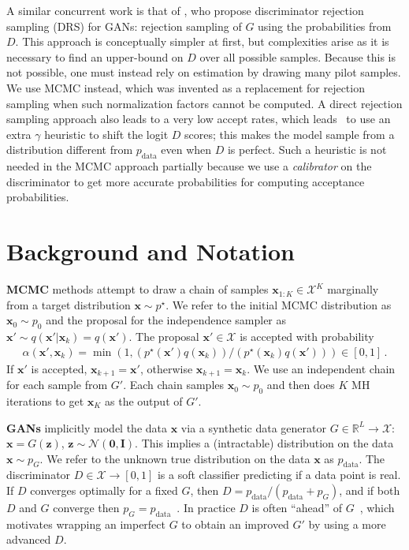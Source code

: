 \documentclass{article}
\renewcommand{\vec}[1]{{\boldsymbol{\mathbf{#1}}}} %
\newcommand{\R}{\mathbb{R}}
\newcommand{\set}[1]{\mathcal{#1}}
\newcommand{\sample}{\sim}
\newcommand{\given}{|}
\newcommand{\norm}{\mathcal{N}}
\newcommand{\target}{{p^\star}}
\newcommand{\prop}{q}
\newcommand{\pinit}{{p_0}}
\newcommand{\PG}{{p_G}}
\newcommand{\PR}{{p_{\textrm{data}}}}
\newcommand{\accept}{\alpha}
\newcommand{\setx}{\set{X}}
\begin{document}
A similar concurrent work is that of \citet{Azadi2018}, who propose discriminator rejection sampling (DRS) for GANs: rejection sampling of $G$ using the probabilities from $D$.
This approach is conceptually simpler at first, but complexities arise as it is necessary to find an upper-bound on $D$ over all possible samples.
Because this is not possible, one must instead rely on estimation by drawing many pilot samples.
We use MCMC instead, which was invented as a replacement for rejection sampling when such normalization factors cannot be computed.
A direct rejection sampling approach also leads to a very low accept rates, which leads~\citet{Azadi2018} to use an extra $\gamma$ heuristic to shift the logit $D$ scores; this makes the model sample from a distribution different from $\PR$ even when $D$ is perfect.
Such a heuristic is not needed in the MCMC approach partially because we use a \emph{calibrator} on the discriminator to get more accurate probabilities for computing acceptance probabilities.

\section{Background and Notation}
\label{sec:Background}

\textbf{MCMC} methods attempt to draw a chain of samples $\vec x_{1:K} \in \setx^K$ marginally from a target distribution $\vec x \sample \target$.
We refer to the initial MCMC distribution as $\vec x_0 \sample \pinit$ and the proposal for the independence sampler as $\vec x' \sample \prop(\vec x' \given \vec x_k)=\prop(\vec x')$.
The proposal $\vec x' \in \setx$ is accepted with probability
\begin{align}
  \accept(\vec x', \vec x_k) = \min\left(1, (\target(\vec x')\prop(\vec x_k))/(\target(\vec x_k)\prop(\vec x'))\right) \in [0,1]\,. \label{eq:alpha def}
\end{align}
If $\vec x'$ is accepted, $\vec x_{k+1} = \vec x'$, otherwise $\vec x_{k+1} = \vec x_k$.
We use an independent chain for each sample from $G'$.
Each chain samples $\vec x_0 \sample \pinit$ and then does $K$ MH iterations to get $\vec x_K$ as the output of $G'$.

\textbf{GANs} implicitly model the data $\vec x$ via a synthetic data generator $G \in \R^L \rightarrow \setx$: $\vec x = G(\vec z)$, $\vec z \sample \norm(\vec 0, \vec I)$.
This implies a (intractable) distribution on the data $\vec x \sample \PG$.
We refer to the unknown true distribution on the data $\vec x$ as $\PR$.
The discriminator $D \in \setx \rightarrow [0,1]$ is a soft classifier predicting if a data point is real.
If $D$ converges optimally for a fixed $G$, then $D = \PR/(\PR + \PG)$, and if both $D$ and $G$ converge then $\PG = \PR$~\citep{Goodfellow2014}.
In practice $D$ is often ``ahead'' of $G$~\citep{Shibuya2017}, which motivates wrapping an imperfect $G$ to obtain an improved $G'$ by using a more advanced $D$.
\end{document}
